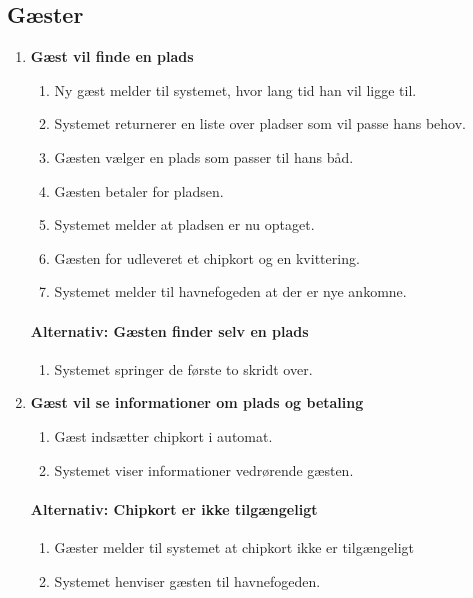 \subsection{Gæster}
  \begin{enumerate}

    \item{\bf{Gæst vil finde en plads}}
      \begin{enumerate}
        \item Ny gæst melder til systemet, hvor lang tid han vil ligge til.
        \item Systemet returnerer en liste over pladser som vil passe hans behov.
        \item Gæsten vælger en plads som passer til hans båd.
        \item Gæsten betaler for pladsen.
        \item Systemet melder at pladsen er nu optaget.
        \item Gæsten for udleveret et chipkort og en kvittering.
        \item Systemet melder til havnefogeden at der er nye ankomne.
      \end{enumerate}

    \paragraph{Alternativ: Gæsten finder selv en plads}
      \begin{enumerate}
        \item Systemet springer de første to skridt over.
      \end{enumerate}


    \item{\bf{Gæst vil se informationer om plads og betaling}}
      \begin{enumerate}
        \item Gæst indsætter chipkort i automat.
        \item Systemet viser informationer vedrørende gæsten.
      \end{enumerate}

    \paragraph{Alternativ: Chipkort er ikke tilgængeligt}
      \begin{enumerate}
        \item Gæster melder til systemet at chipkort ikke er tilgængeligt
        \item Systemet henviser gæsten til havnefogeden.
      \end{enumerate}



\end{enumerate}
